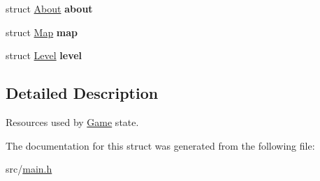 \begin{DoxyCompactItemize}
\item 
\hypertarget{structGame_a0f7f35de759c984c4b53c86fb0dcbd44}{struct \hyperlink{structAbout}{\-About} {\bfseries about}}\label{structGame_a0f7f35de759c984c4b53c86fb0dcbd44}

\item 
\hypertarget{structGame_aaab875b9e556df53251db40341046cab}{struct \hyperlink{structMap}{\-Map} {\bfseries map}}\label{structGame_aaab875b9e556df53251db40341046cab}

\item 
\hypertarget{structGame_aa258068886c6db9c88d73e07c7e114f2}{struct \hyperlink{structLevel}{\-Level} {\bfseries level}}\label{structGame_aa258068886c6db9c88d73e07c7e114f2}

\end{DoxyCompactItemize}


\subsection{\-Detailed \-Description}
\-Resources used by \hyperlink{structGame}{\-Game} state. 

\-The documentation for this struct was generated from the following file\-:\begin{DoxyCompactItemize}
\item 
src/\hyperlink{main_8h}{main.\-h}\end{DoxyCompactItemize}
